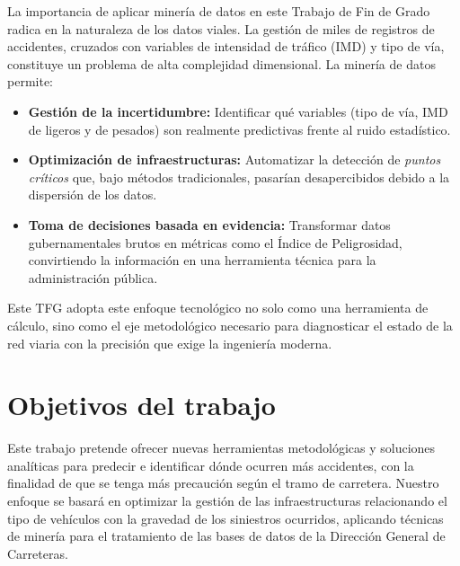 \documentclass[twoside,a4paper,12pt,onecolumn,openany]{book}
\begin{document}
\vspace{0.5cm}

La importancia de aplicar minería de datos en este Trabajo de Fin de Grado radica en la naturaleza de los datos viales. La gestión de miles de registros de accidentes, cruzados con variables de intensidad de tráfico (IMD) y tipo de vía, constituye un problema de alta complejidad dimensional. La minería de datos permite:

\begin{itemize}
    \item \textbf{Gestión de la incertidumbre:} Identificar qué variables (tipo de vía, IMD de ligeros y de pesados) son realmente predictivas frente al ruido estadístico.
    \item \textbf{Optimización de infraestructuras:} Automatizar la detección de \textit{puntos críticos} que, bajo métodos tradicionales, pasarían desapercibidos debido a la dispersión de los datos.
    \item \textbf{Toma de decisiones basada en evidencia:} Transformar datos gubernamentales brutos en métricas como el Índice de Peligrosidad, convirtiendo la información en una herramienta técnica para la administración pública.
\end{itemize}

\vspace{0.5cm}

Este TFG adopta este enfoque tecnológico no solo como una herramienta de cálculo, sino como el eje metodológico necesario para diagnosticar el estado de la red viaria con la precisión que exige la ingeniería moderna.

\vspace{0.5cm}
\section{Objetivos del trabajo}
\vspace{0.5cm}

Este trabajo pretende ofrecer nuevas herramientas metodológicas y soluciones analíticas para predecir e identificar dónde ocurren más accidentes, con la finalidad de que se tenga más precaución según el tramo de carretera. Nuestro enfoque se basará en optimizar la gestión de las infraestructuras relacionando el tipo de vehículos con la gravedad de los siniestros ocurridos, aplicando técnicas de minería para el tratamiento de las bases de datos de la Dirección General de Carreteras.

\vspace{0.5cm}
\end{document}
